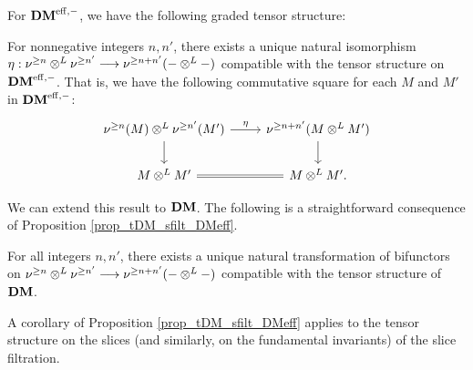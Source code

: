 For $\mathbf{DM}^{\mathrm{eff},-}$, we have the following graded tensor structure:

\begin{prop}\label{prop_tDM_sfilt_DMeff}
For nonnegative integers $n, n'$, there exists a unique natural
isomorphism $\eta: \nu^{\geq n} \otimes^L \nu^{\geq n'} \longrightarrow \nu^{\geq n + n'}(- 
\otimes^L -)$ compatible with the tensor structure on $\mathbf{DM}^{\mathrm{eff},-}$. That 
is, we have the following commutative square for each $M$ and
$M'$ in $\mathbf{DM}^{\mathrm{eff},-}$:
\[
\begin{tikzcd}
\sgDM{n}(M) \tDM \sgDM{n'}(M') \arrow{r}{\eta} \arrow{d} &
\sgDM{n + n'}(M \tDM M') \arrow{d} \\
M \tDM M' \arrow[equals]{r} &
M \tDM M'.
\end{tikzcd}
\]
\end{prop}

We can extend this result to $\mathbf{DM}$. The following is a
straightforward consequence of Proposition 
\ref{prop_tDM_sfilt_DMeff}.

\begin{cor}\label{cor_tDM_sfilt_DM}
For all integers $n, n'$, there exists a unique natural 
transformation of bifunctors on $\nu^{\geq n} \otimes^L \nu^{\geq n'} \longrightarrow 
\nu^{\geq n + n'}(- \otimes^L -)$ compatible with the tensor structure of 
$\mathbf{DM}$.
\end{cor}

A corollary of Proposition \ref{prop_tDM_sfilt_DMeff} applies to 
the tensor structure on the slices (and similarly, on the 
fundamental invariants) of the slice filtration.


